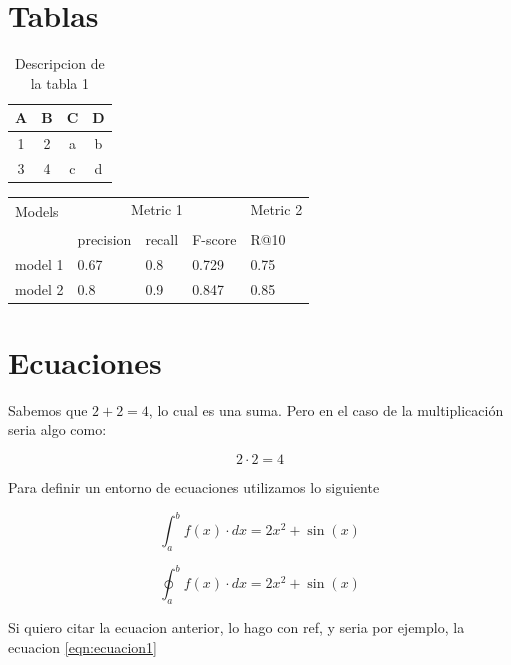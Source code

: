 \documentclass[12pt, letterpaper]{article}
\begin{document}
\section{Tablas}

\begin{table}[h]
    \centering
    \begin{tabular}{cccc}
        \toprule
        A & B & C & D \\ \midrule
        1 & 2 & a & b \\ \midrule
        3 & 4 & c & d \\ 
        \bottomrule
    \end{tabular}
    \caption{Descripcion de la tabla 1}
    \label{tab:tabla1}
\end{table}

\blindtext

\begin{table}[H]
    \centering
    \begin{tabular}{lllll}
        \toprule
        \multirow{2}{*}{Models} & \multicolumn{3}{c}{Metric 1} & Metric 2\\
        \cmidrule{2-4} \cmidrule{5-5} \\
        {} & precision & recall & F-score  & R@10 \\
        \midrule
        model 1 & 0.67  & 0.8 & 0.729  & 0.75 \\
        model 2 & 0.8 & 0.9 & 0.847 & 0.85 \\
        \bottomrule
    \end{tabular}
\end{table}
\section{Ecuaciones}
Sabemos que $2+2=4$, lo cual es una suma. Pero en el caso de la multiplicación seria algo como:

$$ 2\cdot 2 = 4 $$

Para definir un entorno de ecuaciones utilizamos lo siguiente

\begin{equation}
    \int_{a}^{b} f(x)\cdot dx = 2x^2+\sin(x)
    \label{eqn:ecuacion1}
\end{equation}

\begin{equation*}
    \oint_{a}^{b} f(x)\cdot dx = 2x^2+\sin(x)
    \label{eqn:ecuacion2}
\end{equation*}

Si quiero citar la ecuacion anterior, lo hago con ref, y seria por ejemplo, la ecuacion \ref{eqn:ecuacion1}
\end{document}
